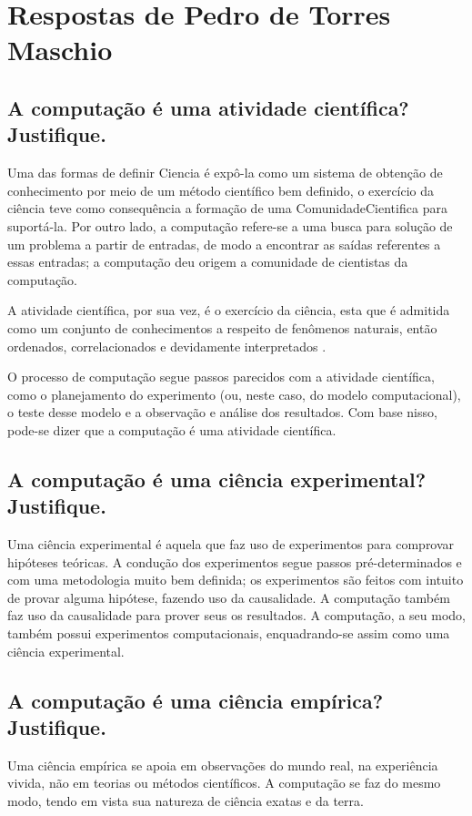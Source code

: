 \section{Respostas de Pedro de Torres Maschio\label{tarefa-pedro-maschio-componentes-eperimento}}



\subsection{A computação é uma atividade científica? Justifique. }

Uma das formas de definir \gls{Ciencia} é expô-la como um sistema de obtenção de conhecimento por meio de um método científico  bem definido, o exercício da ciência teve como consequência a formação de uma \gls{ComunidadeCientifica} para suportá-la. Por outro lado, a computação refere-se a uma busca para solução de um problema a partir de entradas, de modo a encontrar as saídas referentes a essas entradas; a computação deu origem a comunidade de cientistas da computação.

A atividade científica, por sua vez, é o exercício da ciência, esta que é admitida como um conjunto de conhecimentos a respeito de fenômenos naturais, então ordenados, correlacionados e devidamente interpretados
\cite{decourt_atividade_nodate}.

O processo de computação segue passos parecidos com a atividade científica, como o \gls{planejamento} do experimento (ou, neste caso, do modelo computacional), o teste desse modelo e a observação e análise dos resultados. Com base nisso, pode-se dizer que a computação é uma atividade científica.

\subsection{A computação é uma ciência experimental? Justifique. }

Uma ciência experimental é aquela que faz uso de experimentos para comprovar hipóteses teóricas. A condução dos experimentos segue passos pré-determinados e com uma metodologia muito bem definida; os experimentos são feitos com intuito de provar alguma hipótese, fazendo uso da causalidade. A computação também faz uso da causalidade para prover seus os resultados. A computação, a seu modo, também possui experimentos computacionais, enquadrando-se assim como uma ciência experimental.

\subsection{A computação é uma ciência empírica? Justifique. }

Uma ciência empírica se apoia em observações do mundo real, na experiência vivida, não em teorias ou métodos científicos. A computação se faz do mesmo modo, tendo em vista sua natureza de ciência exatas e da terra.